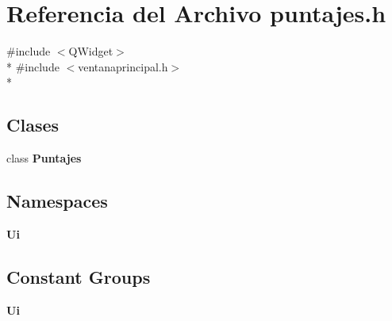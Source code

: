 \section{Referencia del Archivo puntajes.\-h}
\label{puntajes_8h}
{\ttfamily \#include $<$Q\-Widget$>$}\\*
{\ttfamily \#include $<$ventanaprincipal.\-h$>$}\\*
\subsection*{Clases}
\begin{DoxyCompactItemize}
\item 
class {\bf Puntajes}
\end{DoxyCompactItemize}
\subsection*{Namespaces}
\begin{DoxyCompactItemize}
\item 
{\bf Ui}
\end{DoxyCompactItemize}
\subsection*{Constant Groups}
\begin{DoxyCompactItemize}
\item 
{\bf Ui}
\end{DoxyCompactItemize}
